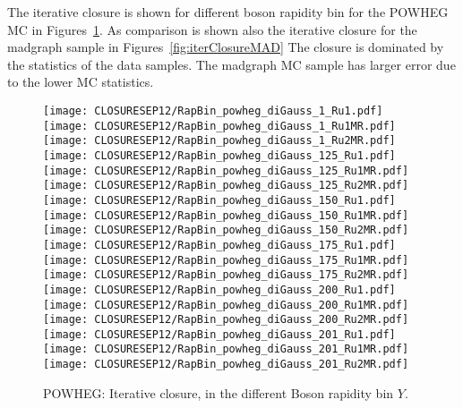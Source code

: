\documentclass[41pt,a4paper,oneside]{report}
\begin{document}
The iterative closure is shown for different boson rapidity bin for the POWHEG MC in Figures~\ref{fig:iterClosurePOW}.
As comparison is shown also the iterative closure for the madgraph sample in Figures~\ref{fig:iterClosureMAD}
The closure is dominated by the statistics of the data samples. 
The madgraph MC sample has larger error due to the lower MC statistics.

\begin{figure}[h!]
  \begin{center}
    \texttt{[image: CLOSURESEP12/RapBin\_powheg\_diGauss\_1\_Ru1.pdf]}
    \texttt{[image: CLOSURESEP12/RapBin\_powheg\_diGauss\_1\_Ru1MR.pdf]}
    \texttt{[image: CLOSURESEP12/RapBin\_powheg\_diGauss\_1\_Ru2MR.pdf]}
    \texttt{[image: CLOSURESEP12/RapBin\_powheg\_diGauss\_125\_Ru1.pdf]}
    \texttt{[image: CLOSURESEP12/RapBin\_powheg\_diGauss\_125\_Ru1MR.pdf]}
    \texttt{[image: CLOSURESEP12/RapBin\_powheg\_diGauss\_125\_Ru2MR.pdf]}
    \texttt{[image: CLOSURESEP12/RapBin\_powheg\_diGauss\_150\_Ru1.pdf]}
    \texttt{[image: CLOSURESEP12/RapBin\_powheg\_diGauss\_150\_Ru1MR.pdf]}
    \texttt{[image: CLOSURESEP12/RapBin\_powheg\_diGauss\_150\_Ru2MR.pdf]}
    \texttt{[image: CLOSURESEP12/RapBin\_powheg\_diGauss\_175\_Ru1.pdf]}
    \texttt{[image: CLOSURESEP12/RapBin\_powheg\_diGauss\_175\_Ru1MR.pdf]}
    \texttt{[image: CLOSURESEP12/RapBin\_powheg\_diGauss\_175\_Ru2MR.pdf]}
    \texttt{[image: CLOSURESEP12/RapBin\_powheg\_diGauss\_200\_Ru1.pdf]}
    \texttt{[image: CLOSURESEP12/RapBin\_powheg\_diGauss\_200\_Ru1MR.pdf]}
    \texttt{[image: CLOSURESEP12/RapBin\_powheg\_diGauss\_200\_Ru2MR.pdf]}
    \texttt{[image: CLOSURESEP12/RapBin\_powheg\_diGauss\_201\_Ru1.pdf]}
    \texttt{[image: CLOSURESEP12/RapBin\_powheg\_diGauss\_201\_Ru1MR.pdf]}
    \texttt{[image: CLOSURESEP12/RapBin\_powheg\_diGauss\_201\_Ru2MR.pdf]}
    \caption{POWHEG: Iterative closure, in the different Boson rapidity bin $Y$.}
    \label{fig:iterClosurePOW}
  \end{center}
\end{figure}
\end{document}
